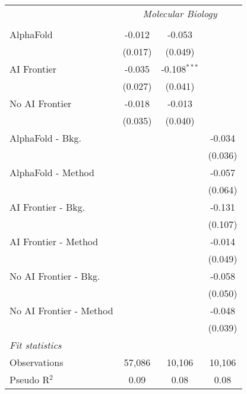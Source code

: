 \begin{tabular}{lccc}
 & \multicolumn{3}{c}{\textit{Molecular Biology}} \\ \\
   AlphaFold               & -0.012  & -0.053         &   \\   
                           & (0.017) & (0.049)        &   \\   
   AI Frontier             & -0.035  & -0.108$^{***}$ &   \\   
                           & (0.027) & (0.041)        &   \\   
   No AI Frontier          & -0.018  & -0.013         &   \\   
                           & (0.035) & (0.040)        &   \\   
   AlphaFold - Bkg.        &         &                & -0.034\\   
                           &         &                & (0.036)\\   
   AlphaFold - Method      &         &                & -0.057\\   
                           &         &                & (0.064)\\   
   AI Frontier - Bkg.      &         &                & -0.131\\   
                           &         &                & (0.107)\\   
   AI Frontier - Method    &         &                & -0.014\\   
                           &         &                & (0.049)\\   
   No AI Frontier - Bkg.   &         &                & -0.058\\   
                           &         &                & (0.050)\\   
   No AI Frontier - Method &         &                & -0.048\\   
                           &         &                & (0.039)\\   
   \midrule
   \emph{Fit statistics}\\
   Observations            & 57,086  & 10,106         & 10,106\\  
   Pseudo R$^2$            & 0.09    & 0.08           & 0.08\\  
   

\end{tabular}

